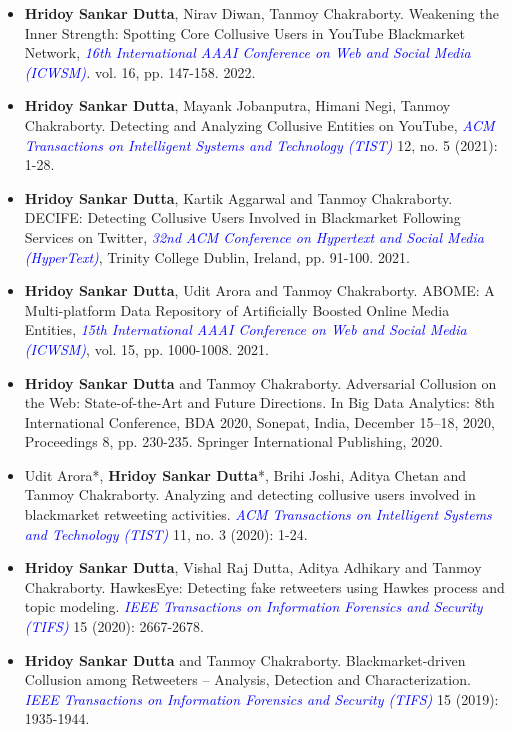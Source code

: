 \documentclass[margin, centered,lmodern]{res}
\begin{document}
\begin{resume}
\begin{itemize}[leftmargin=*]
\item \textbf{Hridoy Sankar Dutta}, Nirav Diwan, Tanmoy Chakraborty. Weakening the Inner Strength: Spotting Core Collusive Users in YouTube Blackmarket Network,  \textit{\textcolor{blue}{16th International AAAI Conference on Web and Social Media (ICWSM)}.}  vol. 16, pp. 147-158. 2022.

\item \textbf{Hridoy Sankar Dutta}, Mayank Jobanputra, Himani Negi, Tanmoy Chakraborty. Detecting and Analyzing Collusive Entities on YouTube,   \textit{\textcolor{blue}{ACM Transactions on Intelligent Systems and Technology (TIST)}} 12, no. 5 (2021): 1-28.

\item \textbf{Hridoy Sankar Dutta}, Kartik Aggarwal and Tanmoy Chakraborty. DECIFE: Detecting Collusive Users Involved in Blackmarket Following Services on Twitter, \textit{\textcolor{blue}{32nd ACM Conference on Hypertext and Social Media (HyperText)}}, Trinity College Dublin, Ireland,  pp. 91-100. 2021.

\item \textbf{Hridoy Sankar Dutta}, Udit Arora and Tanmoy Chakraborty. ABOME: A Multi-platform Data Repository of Artificially Boosted Online Media Entities, \textit{\textcolor{blue}{15th International AAAI Conference on Web and Social Media (ICWSM)}}, vol. 15, pp. 1000-1008. 2021.

\item \textbf{Hridoy Sankar Dutta} and Tanmoy Chakraborty. Adversarial Collusion on the Web: State-of-the-Art and Future Directions. In Big Data Analytics: 8th International Conference, BDA 2020, Sonepat, India, December 15–18, 2020, Proceedings 8, pp. 230-235. Springer International Publishing, 2020.

\item Udit Arora*,  \textbf{Hridoy Sankar Dutta}*,  Brihi Joshi,  Aditya Chetan and Tanmoy Chakraborty.  Analyzing and detecting collusive users involved in blackmarket retweeting activities. \textit{\textcolor{blue}{ACM Transactions on Intelligent Systems and Technology (TIST)}} 11, no. 3 (2020): 1-24.

\item \textbf{Hridoy Sankar Dutta},  Vishal Raj Dutta,  Aditya Adhikary and Tanmoy Chakraborty. HawkesEye: Detecting fake retweeters using Hawkes process and topic modeling. \textit{\textcolor{blue}{IEEE Transactions on Information Forensics and Security (TIFS)}} 15 (2020): 2667-2678.

\item \textbf{Hridoy Sankar Dutta} and Tanmoy Chakraborty. Blackmarket-driven Collusion among Retweeters – Analysis, Detection and Characterization. \textit{\textcolor{blue}{IEEE Transactions on Information Forensics and Security (TIFS)}} 15 (2019): 1935-1944.


\end{itemize}
\end{resume}
\end{document}
